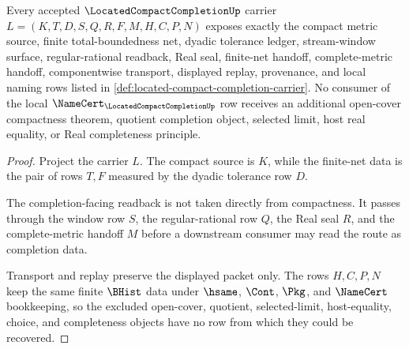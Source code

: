 \begin{theorem}
\label{thm:located-compact-completion-carrier}
Every accepted $\LocatedCompactCompletionUp$ carrier $L=(K,T,D,S,Q,R,F,M,H,C,P,N)$ exposes exactly the compact metric source, finite total-boundedness net, dyadic tolerance ledger, stream-window surface, regular-rational readback, Real seal, finite-net handoff, complete-metric handoff, componentwise transport, displayed replay, provenance, and local naming rows listed in \autoref{def:located-compact-completion-carrier}. No consumer of the local $\NameCert_{\LocatedCompactCompletionUp}$ row receives an additional open-cover compactness theorem, quotient completion object, selected limit, host real equality, or Real completeness principle.
\end{theorem}
\begin{proof}
Project the carrier $L$. The compact source is $K$, while the finite-net data is the pair of rows $T,F$ measured by the dyadic tolerance row $D$.

The completion-facing readback is not taken directly from compactness. It passes through the window row $S$, the regular-rational row $Q$, the Real seal $R$, and the complete-metric handoff $M$ before a downstream consumer may read the route as completion data.

Transport and replay preserve the displayed packet only. The rows $H,C,P,N$ keep the same finite $\BHist$ data under $\hsame$, $\Cont$, $\Pkg$, and $\NameCert$ bookkeeping, so the excluded open-cover, quotient, selected-limit, host-equality, choice, and completeness objects have no row from which they could be recovered.
\end{proof}

